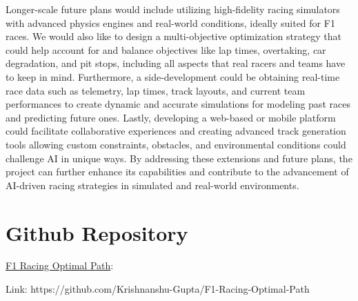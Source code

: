 \documentclass[12pt]{article}
\begin{document}
Longer-scale future plans would include utilizing high-fidelity racing 
simulators with advanced physics engines and real-world conditions, ideally 
suited for F1 races. We would also like to design a multi-objective optimization 
strategy that could help account for and balance objectives like lap times, 
overtaking, car degradation, and pit stops, including all aspects that real 
racers and teams have to keep in mind. Furthermore, a side-development could 
be obtaining real-time race data such as telemetry, lap times, track layouts, 
and current team performances to create dynamic and accurate simulations for 
modeling past races and predicting future ones. Lastly, developing a web-based 
or mobile platform could facilitate collaborative experiences and creating 
advanced track generation tools allowing custom constraints, obstacles, and 
environmental conditions could challenge AI in unique ways. By addressing these 
extensions and future plans, the project can further enhance its capabilities 
and contribute to the advancement of AI-driven racing strategies in simulated 
and real-world environments.

\section{Github Repository}
\href{https://github.com/Krishnanshu-Gupta/F1-Racing-Optimal-Path}{F1 Racing 
Optimal Path}:

Link: https://github.com/Krishnanshu-Gupta/F1-Racing-Optimal-Path
\end{document}
